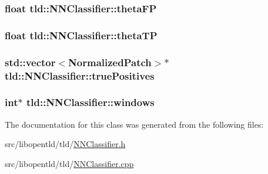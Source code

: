 \label{classtld_1_1_n_n_classifier_abc088471e8f9e259cc07cbb9a704fb28}
\hypertarget{classtld_1_1_n_n_classifier_a5cddbd7f4a38e95a7f00cb1013962b9e}{
\subsubsection[{thetaFP}]{\setlength{\rightskip}{0pt plus 5cm}float {\bf tld::NNClassifier::thetaFP}}}
\label{classtld_1_1_n_n_classifier_a5cddbd7f4a38e95a7f00cb1013962b9e}
\hypertarget{classtld_1_1_n_n_classifier_aada6ca01c7b5224439e375444947cd16}{
\subsubsection[{thetaTP}]{\setlength{\rightskip}{0pt plus 5cm}float {\bf tld::NNClassifier::thetaTP}}}
\label{classtld_1_1_n_n_classifier_aada6ca01c7b5224439e375444947cd16}
\hypertarget{classtld_1_1_n_n_classifier_ac17849309a8aed1fdc3e3247f22b5fa2}{
\subsubsection[{truePositives}]{\setlength{\rightskip}{0pt plus 5cm}std::vector$<${\bf NormalizedPatch}$>$$\ast$ {\bf tld::NNClassifier::truePositives}}}
\label{classtld_1_1_n_n_classifier_ac17849309a8aed1fdc3e3247f22b5fa2}
\hypertarget{classtld_1_1_n_n_classifier_a6a4aab5ed014405c9dbd9162af1b1d7c}{
\subsubsection[{windows}]{\setlength{\rightskip}{0pt plus 5cm}int$\ast$ {\bf tld::NNClassifier::windows}}}
\label{classtld_1_1_n_n_classifier_a6a4aab5ed014405c9dbd9162af1b1d7c}


The documentation for this class was generated from the following files:\begin{DoxyCompactItemize}
\item 
src/libopentld/tld/\hyperlink{_n_n_classifier_8h}{NNClassifier.h}\item 
src/libopentld/tld/\hyperlink{_n_n_classifier_8cpp}{NNClassifier.cpp}\end{DoxyCompactItemize}
